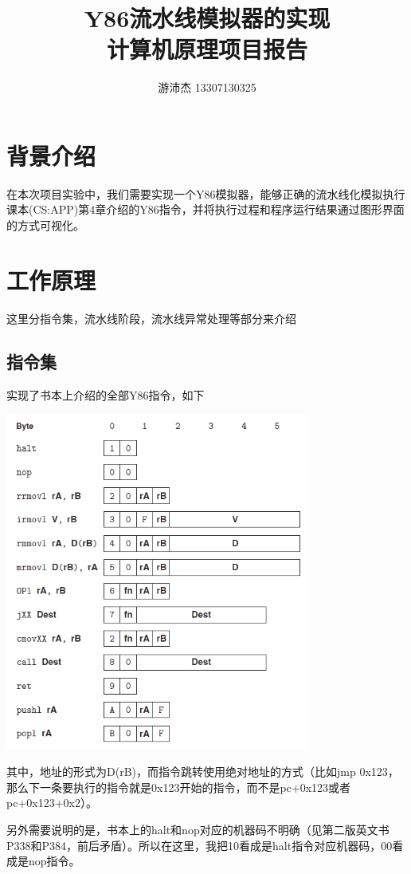 \documentclass{article}
\title{Y86流水线模拟器的实现\\计算机原理项目报告}
\author{游沛杰 13307130325}
\begin{document}
\maketitle
\tableofcontents
\newpage

\section{背景介绍}
\indent\indent
在本次项目实验中，我们需要实现一个Y86模拟器，能够正确的流水线化模拟执行课本(CS:APP\cite{1})第4章介绍的Y86指令，并将执行过程和程序运行结果通过图形界面的方式可视化。

\section{工作原理}
这里分指令集，流水线阶段，流水线异常处理等部分来介绍
\subsection{指令集}
实现了书本上介绍的全部Y86指令，如下

\includegraphics[width = 10cm]{1.png}

其中，地址的形式为D(rB)，而指令跳转使用绝对地址的方式（比如jmp 0x123，那么下一条要执行的指令就是0x123开始的指令，而不是pc+0x123或者pc+0x123+0x2）。

另外需要说明的是，书本上的halt和nop对应的机器码不明确（见第二版英文书P338和P384，前后矛盾）。所以在这里，我把10看成是halt指令对应机器码，00看成是nop指令。
\end{document}
